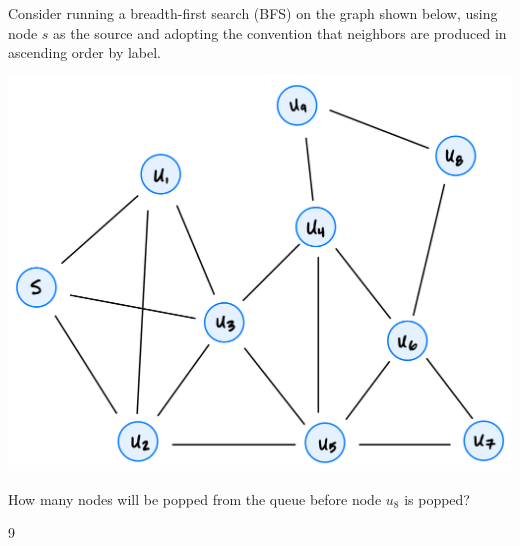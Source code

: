 \begin{prob}
    Consider running a breadth-first search (BFS) on the graph shown below,
    using node $s$ as the source and adopting the convention that neighbors are
    produced in ascending order by label.

    \includegraphics{./graph.png}

    How many nodes will be popped from the queue before node $u_8$ is popped?

    \begin{soln}
        9
    \end{soln}

\end{prob}
